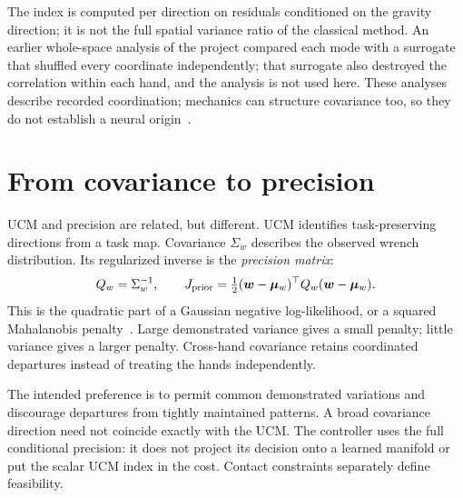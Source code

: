 
The index is computed per direction on residuals conditioned on the gravity direction; it is not the full spatial variance ratio of the classical method. An earlier whole-space analysis of the project compared each mode with a surrogate that shuffled every coordinate independently; that surrogate also destroyed the correlation within each hand, and the analysis is not used here. These analyses describe recorded coordination; mechanics can structure covariance too, so they do not establish a neural origin~\cite{valero2009,kutch2012}.

\section{From covariance to precision}

UCM and precision are related, but different. UCM identifies task-preserving directions from a task map. Covariance $\Sigma_w$ describes the observed wrench distribution. Its regularized inverse is the \emph{precision matrix}:
\begin{equation}
Q_w=\Sigma_w^{-1},\qquad
J_{\mathrm{prior}}=\tfrac12(\bm{w}-\bm{\mu}_w)^\top Q_w(\bm{w}-\bm{\mu}_w).
\label{eq:prior-mahalanobis}
\end{equation}
This is the quadratic part of a Gaussian negative log-likelihood, or a squared Mahalanobis penalty~\cite{bishop2006}. Large demonstrated variance gives a small penalty; little variance gives a larger penalty. Cross-hand covariance retains coordinated departures instead of treating the hands independently.

The intended preference is to permit common demonstrated variations and discourage departures from tightly maintained patterns. A broad covariance direction need not coincide exactly with the UCM. The controller uses the full conditional precision: it does not project its decision onto a learned manifold or put the scalar UCM index in the cost. Contact constraints separately define feasibility.

